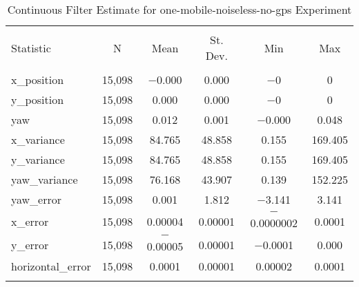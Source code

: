 
\begin{table}[h] \centering 
  \caption{Continuous Filter Estimate for one-mobile-noiseless-no-gps Experiment} 
  \label{tab:one_mobile_noiseless_no_gps_continuous_summary} 
\begin{tabular}{@{\extracolsep{5pt}}lccccc} 
\\[-1.8ex]\hline 
\hline \\[-1.8ex] 
Statistic & \multicolumn{1}{c}{N} & \multicolumn{1}{c}{Mean} & \multicolumn{1}{c}{St. Dev.} & \multicolumn{1}{c}{Min} & \multicolumn{1}{c}{Max} \\ 
\hline \\[-1.8ex] 
x\_position & 15,098 & $-$0.000 & 0.000 & $-$0 & 0 \\ 
y\_position & 15,098 & 0.000 & 0.000 & $-$0 & 0 \\ 
yaw & 15,098 & 0.012 & 0.001 & $-$0.000 & 0.048 \\ 
x\_variance & 15,098 & 84.765 & 48.858 & 0.155 & 169.405 \\ 
y\_variance & 15,098 & 84.765 & 48.858 & 0.155 & 169.405 \\ 
yaw\_variance & 15,098 & 76.168 & 43.907 & 0.139 & 152.225 \\ 
yaw\_error & 15,098 & 0.001 & 1.812 & $-$3.141 & 3.141 \\ 
x\_error & 15,098 & 0.00004 & 0.00001 & $-$0.0000002 & 0.0001 \\ 
y\_error & 15,098 & $-$0.00005 & 0.00001 & $-$0.0001 & 0.000 \\ 
horizontal\_error & 15,098 & 0.0001 & 0.00001 & 0.00002 & 0.0001 \\ 
\hline \\[-1.8ex] 
\end{tabular} 
\end{table} 
